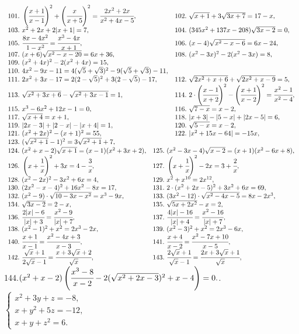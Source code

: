 $\begin{array}{ll}
101.\ \left(\cfrac{x+1}{x-1}\right)^2+\left(\cfrac{x}{x+5}\right)^2=\cfrac{2x^2+2x}{x^2+4x-5},&
102.\ \sqrt{x+1}+3\sqrt{3x+7}=17-x,\\
103.\ x^2+2x+2|x+1|=7,&
104.\ (345x^2+137x-208)\sqrt{3x-2}=0,\\
105.\ \cfrac{8x-4x^2}{1-x^2}=\cfrac{x^3-4x}{x+1},&
106.\ (x-4)\sqrt{x^2-x-6}=6x-24,\\
107.\ (x+6)\sqrt{x^2-x-20}=6x+36,&
108.\ (x^2-3x)^2-2(x^2-3x)=8,\\
109.\ (x^2+4x)^2-2(x^2+4x)=15,\\
110.\ 4x^2-9x-11=4(\sqrt{5}+\sqrt{3})^2-9(\sqrt{5}+\sqrt{3})-11,\\
111.\ 2x^2+3x-17=2(2-\sqrt{5})^2+3(2-\sqrt{5})-17,&
112.\ \sqrt{2x^2+x+6}+\sqrt{2x^2+x-9}=5,\\
113.\ \sqrt{x^2+3x+6}-\sqrt{x^2+3x-1}=1,&
114.\ 2\cdot\left(\cfrac{x-1}{x+2}\right)^2-\left(\cfrac{x+1}{x-2}\right)^2=\cfrac{x^2-1}{x^2-4},\\
115.\ x^3-6x^2+12x-1=0,&
116.\ \sqrt{7-x}=x-2,\\
117.\ \sqrt{x+4}=x+1,&
118.\ |x+3|-|5-x|+|2x-5|=6,\\
119.\ |2x-3|+|2-x|-|x+4|=1,&
120.\ \sqrt{5-x}=x-2,\\
121.\ (x^2+2x)^2-(x+1)^2=55,&
122.\ |x^2+15x-64|=-15x,\\
123.\ (\sqrt{x^2+1}-1)^2=3\sqrt{x^2+1}+7,\end{array}$\\
$\begin{array}{ll}
124.\ (x^2+x-2)\sqrt{x+1}=(x-1)(x^2+3x+2),&
125.\ (x^2-3x-4)\sqrt{x-2}=(x+1)(x^2-6x+8),\\
126.\ \left(x+\cfrac{1}{x}\right)^2+3x=4-\cfrac{3}{x},&
127.\ \left(x+\cfrac{1}{x}\right)^2-2x=3+\cfrac{2}{x},\\
128.\ (x^2-2x)^2-3x^2+6x=4,&
129.\ x^2+x^{10}=2x^{12},\\
130.\ (2x^2-x-4)^2+16x^2-8x=17,&
131.\ 2\cdot(x^2+2x-5)^2+3x^2+6x=69,\\
132.\ (x^2-9)\cdot\sqrt{10-3x-x^2}=x^3-9x,&
133.\ (3x^2-12)\cdot\sqrt{x^2-4x-5}=8x-2x^3,\\
134.\ \sqrt{3x-2}=2-x,&
135.\ \sqrt{5x+2x^2}-x=2,\\
136.\ \cfrac{2|x|-6}{|x|+3}=\cfrac{x^2-9}{|x|+7},&
137.\ \cfrac{4|x|-16}{|x|+4}=\cfrac{x^2-16}{|x|+7},\\
138.\ (x^2-1)^2+x^2=2x^3-2x,&
139.\ (x^2-3)^2+x^2=2x^3-6x,\\
140.\ \cfrac{x+1}{x-1}=\cfrac{x^2-4x+3}{x-3},&
141.\ \cfrac{x+4}{x-2}=\cfrac{x^2-7x+10}{x-5},\\
142.\ \cfrac{\sqrt{x}+1}{2\sqrt{x}-1}=\cfrac{x+3\sqrt{x}+2}{\sqrt{x}},&
143.\ \cfrac{2\sqrt{x}+1}{\sqrt{x}-1}=\cfrac{2x+3\sqrt{x}+1}{\sqrt{x}},
\end{array}$\\
144.$ (x^2+x-2)\left(\cfrac{x^3-8}{x-2}-2(\sqrt{x^2+2x-3})^2
+x-4\right)=0.$. $\begin{cases} x^2+3y+z=-8,\\ x+y^2+5z=-12,\\ x+y+z^2=6.\end{cases}$
\newpage
